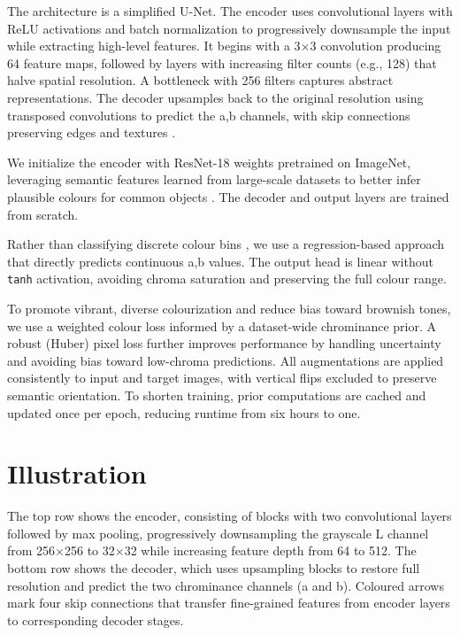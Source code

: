 \documentclass{article} %
\begin{document}
The architecture is a simplified U-Net. The encoder uses convolutional layers with ReLU activations and batch normalization to progressively downsample the input while extracting high-level 
features. It begins with a 3$\times$3 convolution producing 64 feature maps, followed by layers with increasing filter counts (e.g., 128) that halve spatial resolution. A bottleneck with 256 
filters captures abstract representations. The decoder upsamples back to the original resolution using transposed convolutions to predict the a,b channels, with skip connections preserving 
edges and textures \citep{leatvanich2025image}.

We initialize the encoder with ResNet-18 weights pretrained on ImageNet, leveraging semantic features learned from large-scale datasets to better infer plausible colours for common objects 
\citep{olah2022lettherebecolor}. The decoder and output layers are trained from scratch.

Rather than classifying discrete colour bins \citep{olah2022lettherebecolor}, we use a regression-based approach that directly predicts continuous a,b values. The output head is linear without 
\verb|tanh| activation, avoiding chroma saturation and preserving the full colour range.

To promote vibrant, diverse colourization and reduce bias toward brownish tones, we use a weighted colour loss informed by a dataset-wide chrominance prior. A robust (Huber) pixel loss further 
improves performance by handling uncertainty and avoiding bias toward low-chroma predictions. All augmentations are applied consistently to input and target images, with vertical flips excluded 
to preserve semantic orientation. To shorten training, prior computations are cached and updated once per epoch, reducing runtime from six hours to one.

\section{Illustration}

The top row shows the encoder, consisting of blocks with two convolutional layers followed by max pooling, progressively downsampling the grayscale L channel from 256$\times$256 to 32$\times$32 
while increasing feature depth from 64 to 512. The bottom row shows the decoder, which uses upsampling blocks to restore full resolution and predict the two chrominance channels (a and b). Coloured 
arrows mark four skip connections that transfer fine-grained features from encoder layers to corresponding decoder stages.
\end{document}
